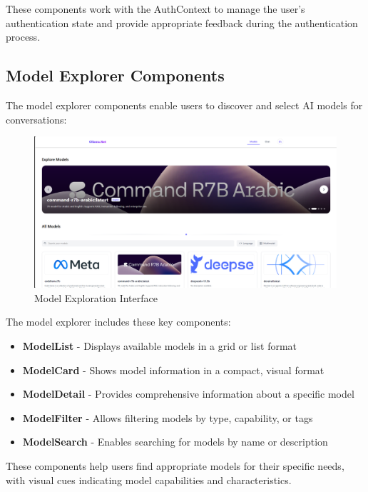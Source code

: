 These components work with the AuthContext to manage the user's authentication state and provide appropriate feedback during the authentication process.

\subsection{Model Explorer Components}

The model explorer components enable users to discover and select AI models for conversations:

\begin{figure}[p]
    \centering
    \includegraphics[width=\textwidth]{./Chapter07/figures/model_explorer_ui.png}
    \caption{Model Exploration Interface}
    \label{fig:model-explorer-ui}
\end{figure}
\clearpage

The model explorer includes these key components:

\begin{itemize}
  \item \textbf{ModelList} - Displays available models in a grid or list format
  \item \textbf{ModelCard} - Shows model information in a compact, visual format
  \item \textbf{ModelDetail} - Provides comprehensive information about a specific model
  \item \textbf{ModelFilter} - Allows filtering models by type, capability, or tags
  \item \textbf{ModelSearch} - Enables searching for models by name or description
\end{itemize}

These components help users find appropriate models for their specific needs, with visual cues indicating model capabilities and characteristics.

